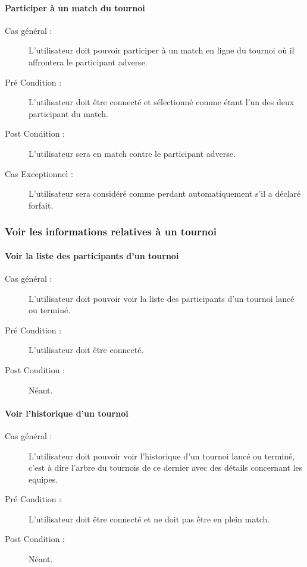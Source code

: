 \documentclass[a4paper]{article}
\begin{document}
\paragraph{Participer à un match du tournoi}
\begin{description}
\item[Cas général :] L'\gls{utilisateur} doit pouvoir participer à un match en ligne du tournoi où il affrontera le \gls{participant} adverse.
\item[Pré Condition  :] L'\gls{utilisateur} doit être connecté et sélectionné comme étant l'un des deux \gls{participant} du match.
\item[Post Condition :] L'\gls{utilisateur} sera en match contre le \gls{participant} adverse.
\item[Cas Exceptionnel :] L'\gls{utilisateur} sera considéré comme perdant automatiquement s'il a déclaré forfait.
\end{description}

\subsubsection{Voir les informations relatives à un tournoi}
\paragraph{Voir la liste des \glspl{participant} d'un tournoi}
\begin{description}
\item[Cas général :] L'\gls{utilisateur} doit pouvoir voir la liste des \glspl{participant} d'un tournoi lancé ou terminé.
\item[Pré Condition  :] L'\gls{utilisateur} doit être connecté.
\item[Post Condition :] Néant.
\end{description}
\paragraph{Voir l'historique d'un tournoi}
\begin{description}
    \item[Cas général :] L'\gls{utilisateur} doit pouvoir voir l'historique d'un tournoi lancé ou terminé, c'est à dire l'arbre du tournois de ce dernier avec des détails concernant les \glspl{equipe}.
    \item[Pré Condition  :] L'\gls{utilisateur} doit être connecté et ne doit pas être en plein match.
    \item[Post Condition :] Néant.
\end{description}
\end{document}
